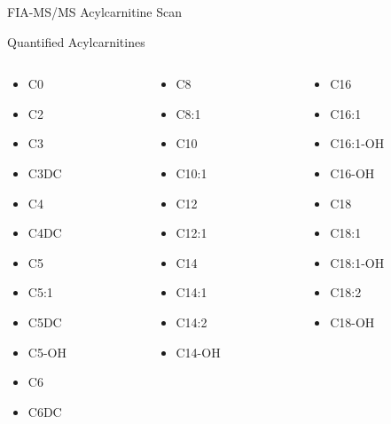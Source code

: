 \documentclass[presentation, smaller]{beamer}
\begin{document}
\begin{frame}[label={sec:orgheadline13}]{FIA-MS/MS Acylcarnitine Scan}
\begin{block}{Quantified Acylcarnitines}
\begin{columns}
\begin{column}{0.3\columnwidth}
\begin{itemize}
\item C0
\item C2
\item C3
\item C3DC
\item C4
\item C4DC
\item C5
\item C5:1
\item C5DC
\item C5-OH
\item C6
\item C6DC
\end{itemize}
\end{column}
\begin{column}{0.3\columnwidth}
\begin{itemize}
\item C8
\item C8:1
\item C10
\item C10:1
\item C12
\item C12:1
\item C14
\item C14:1
\item C14:2
\item C14-OH
\end{itemize}
\end{column}
\begin{column}{0.3\columnwidth}
\begin{itemize}
\item C16
\item C16:1
\item C16:1-OH
\item C16-OH
\item C18
\item C18:1
\item C18:1-OH
\item C18:2
\item C18-OH
\end{itemize}
\end{column}
\end{columns}
\end{block}
\end{frame}
\end{document}
